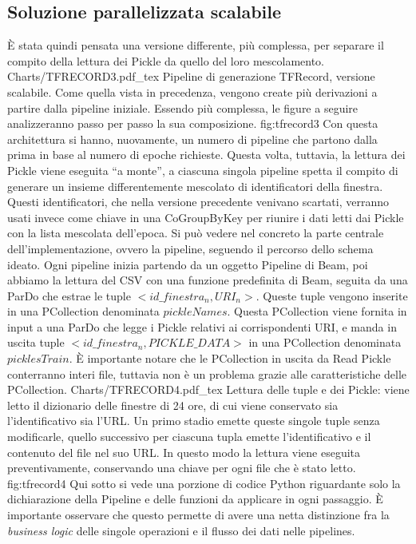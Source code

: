 \subsection{Soluzione parallelizzata scalabile}
È stata quindi pensata una versione differente, più complessa, per separare il compito della lettura dei Pickle da quello del loro mescolamento.
\svg
{Charts/TFRECORD3.pdf_tex}
{Pipeline di generazione TFRecord, versione scalabile. Come quella vista in precedenza, vengono create più derivazioni a partire dalla pipeline iniziale. Essendo più complessa, le figure a seguire analizzeranno passo per passo la sua composizione. }
{fig:tfrecord3}
Con questa architettura si hanno, nuovamente, un numero di pipeline che partono dalla prima in base al numero di epoche richieste. Questa volta, tuttavia, la lettura dei Pickle viene eseguita “a monte”, a ciascuna singola pipeline spetta il compito di generare un insieme differentemente mescolato di identificatori della finestra. Questi identificatori, che nella versione precedente venivano scartati, verranno usati invece come chiave in una CoGroupByKey per riunire i dati letti dai Pickle con la lista mescolata dell’epoca. Si può vedere nel concreto la parte centrale dell’implementazione, ovvero la pipeline, seguendo il percorso dello schema ideato. Ogni pipeline inizia partendo da un oggetto Pipeline di Beam, poi abbiamo la lettura del CSV con una funzione predefinita di Beam, seguita da una ParDo che estrae le tuple $ <id\_finestra_n, URI_n> $. Queste tuple vengono inserite in una PCollection denominata $ pickleNames $. Questa PCollection viene fornita in input a una ParDo che legge i Pickle relativi ai corrispondenti URI, e manda in uscita tuple $ <id\_finestra_n, PICKLE\_DATA> $ in una PCollection denominata $ picklesTrain $. È importante notare che le PCollection in uscita da Read Pickle conterranno interi file, tuttavia non è un problema grazie alle caratteristiche delle PCollection.
\svg
{Charts/TFRECORD4.pdf_tex}
{Lettura delle tuple e dei Pickle: viene letto il dizionario delle finestre di 24 ore, di cui viene conservato sia l'identificativo sia l'URL. Un primo stadio emette queste singole tuple senza modificarle, quello successivo per ciascuna tupla emette l'identificativo e il contenuto del file nel suo URL. In questo modo la lettura viene eseguita preventivamente, conservando una chiave per ogni file che è stato letto.}
{fig:tfrecord4}
Qui sotto si vede una porzione di codice Python riguardante solo la dichiarazione della Pipeline e delle funzioni da applicare in ogni passaggio. È importante osservare che questo permette di avere una netta distinzione fra la \textit{business logic} delle singole operazioni e il flusso dei dati nelle pipelines.
